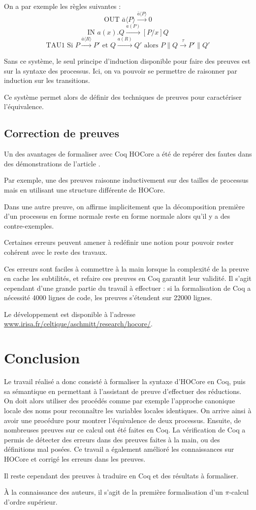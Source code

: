 \documentclass[11pt]{article}
\def\pic{$\pi$-calcul }
\begin{document}
On a par exemple les règles suivantes : 
$$\text{OUT } \bar{a}\langle P\rangle \overset{\bar{a}\langle P\rangle}{\longrightarrow} 0$$
$$\text{IN } a(x).Q \overset{a(P)}{\longrightarrow} [P/x]Q$$
$$\text{TAU1 Si } P\overset{\bar{a}\langle R\rangle}{\longrightarrow} P' \text{ et } Q\overset{a(R)}{\longrightarrow} Q' \text{ alors } P\|Q \overset{\tau}{\longrightarrow} P'\|Q'$$

Sans ce système, le seul principe d'induction disponible pour faire des preuves est sur la syntaxe des processus. Ici, on va pouvoir se permettre de raisonner par induction sur les transitions.

Ce système permet alors de définir des techniques de preuves pour caractériser l'équivalence.

\subsection{Correction de preuves}
Un des avantages de formaliser avec Coq HOCore a été de repérer des fautes dans des démonstrations de l'article \cite{expressiveness}.

Par exemple, une des preuves raisonne inductivement sur des tailles de processus mais en utilisant une structure différente de HOCore.

Dans une autre preuve, on affirme implicitement que la décomposition première d'un processus en forme normale reste en forme normale alors qu'il y a des contre-exemples.

Certaines erreurs peuvent amener à redéfinir une notion pour pouvoir rester cohérent avec le reste des travaux.

Ces erreurs sont faciles à commettre à la main lorsque la complexité de la preuve en cache les subtilités, et refaire ces preuves en Coq garantit leur validité. Il s'agit cependant d'une grande partie du travail à effectuer : si la formalisation de Coq a nécessité 4000 lignes de code, les preuves s'étendent sur 22000 lignes. 

Le développement est disponible à l'adresse \url{www.irisa.fr/celtique/aschmitt/research/hocore/}.

\section{Conclusion}
Le travail réalisé a donc consisté à formaliser la syntaxe d'HOCore en Coq, puis sa sémantique en permettant à l'assistant de preuve d'effectuer des réductions. 
On doit alors utiliser des procédés comme par exemple l'approche canonique locale des noms pour reconnaître les variables locales identiques.
On arrive ainsi à avoir une procédure pour montrer l'équivalence de deux processus. %
Ensuite, de nombreuses preuves sur ce calcul ont été faites en Coq. La vérification de Coq a permis de détecter des erreurs dans des preuves faites à la main, ou des définitions mal posées. Ce travail a également amélioré les connaissances sur HOCore et corrigé les erreurs dans les preuves.

Il reste cependant des preuves à traduire en Coq et des résultats à formaliser. %

À la connaissance des auteurs, il s'agit de la première formalisation d'un \pic d'ordre supérieur. 
\newpage


\end{document}
